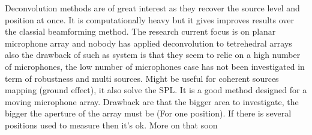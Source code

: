 Deconvolution methods are of great interest as they recover the source level and position at once. It is computationally heavy but it gives improves results over the classial beamforming method. The research current focus is on planar microphone array and nobody has applied deconvolution to tetrehedral arrays also the drawback of such as system is that they seem to relie on a high number of microphones, the low number of microphones case has not been investigated in term of robustness and multi sources.
Might be useful for coherent sources mapping (ground effect), it also solve the SPL. It is a good method designed for a moving microphone array. Drawback are that the bigger area to investigate, the bigger the aperture of the array must be (For one position). If there is several positions used to measure then it's ok.  More on that soon